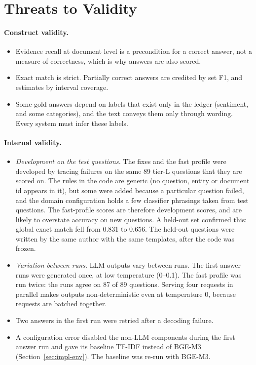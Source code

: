 \documentclass[11pt,letterpaper,oneside]{report}
\begin{document}
\section{Threats to Validity}
\label{sec:threats}

\paragraph{Construct validity.}
\begin{itemize}
  \item Evidence recall at document level is a precondition for a correct
  answer, not a measure of correctness, which is why answers are also
  scored.
  \item Exact match is strict. Partially correct answers are credited by set
  F1, and estimates by interval coverage.
  \item Some gold answers depend on labels that exist only in the ledger
  (sentiment, and some categories), and the text conveys them only through
  wording. Every system must infer these labels.
\end{itemize}

\paragraph{Internal validity.}
\begin{itemize}
  \item \emph{Development on the test questions.} The fixes and the fast
  profile were developed by tracing failures on the same 89 tier-L
  questions that they are scored on. The rules in the code are generic (no
  question, entity or document id appears in it), but some were added
  because a particular question failed, and the domain configuration holds
  a few classifier phrasings taken from test questions. The fast-profile scores are therefore
  development scores, and are likely to overstate accuracy on new questions.
  A held-out set confirmed this: global exact match fell from 0.831 to 0.656.
  The held-out questions were written by the same author with the same
  templates, after the code was frozen.
  \item \emph{Variation between runs.} LLM outputs vary between runs. The
  first answer runs were generated once, at low temperature (0--0.1). The
  fast profile was run twice: the runs agree on 87 of 89 questions. Serving
  four requests in parallel makes outputs non-deterministic even at
  temperature 0, because requests are batched together.
  \item Two answers in the first run were retried after a decoding failure.
  \item A configuration error disabled the non-LLM components during the
  first answer run and gave its baseline TF-IDF instead of BGE-M3
  (Section~\ref{sec:impl-env}). The baseline was re-run with BGE-M3.
\end{itemize}
\end{document}

